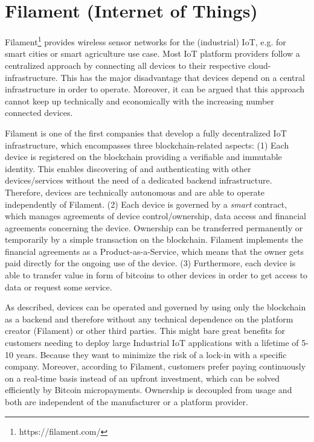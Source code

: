 \section{Filament (Internet of Things)}
\label{sec:ecofilament}

Filament\footnote{https://filament.com/} provides wireless sensor networks for the (industrial) IoT, e.g. 
for smart cities or smart agriculture use case. Most IoT platform providers follow 
a centralized approach by connecting all devices to their respective cloud-infrastructure. 
This has the major disadvantage that devices depend on a central infrastructure 
in order to operate. Moreover, it can be argued that this approach cannot keep 
up technically and economically with the increasing number connected devices.

Filament is one of the first companies that develop a fully decentralized IoT infrastructure, 
which encompasses three blockchain-related aspects: (1) Each device is registered 
on the blockchain providing a verifiable and immutable identity. This enables discovering 
of and authenticating with other devices/services without the need of a dedicated 
backend infrastructure. Therefore, devices are technically autonomous and are able 
to operate independently of Filament. (2) Each device is governed by a \emph{smart} 
contract, which manages agreements of device control/ownership, data access and 
financial agreements concerning the device. Ownership can be transferred permanently 
or temporarily by a simple transaction on the blockchain. Filament implements the 
financial agreements as a Product-as-a-Service, which means that the owner gets 
paid directly for the ongoing use of the device. (3) Furthermore, each device is 
able to transfer value in form of bitcoins to other devices in order to get access 
to data or request some service.

As described, devices can be operated and governed by using only the blockchain 
as a backend and therefore without any technical dependence on the platform creator 
(Filament) or other third parties. This might bare great benefits for customers 
needing to deploy large Industrial IoT applications with a lifetime of 5-10 years. 
Because they want to minimize the risk of a lock-in with a specific company. Moreover, 
according to Filament, customers prefer paying continuously on a real-time basis 
instead of an upfront investment, which can be solved efficiently by Bitcoin micropayments. 
Ownership is decoupled from usage and both are independent of the manufacturer 
or a platform provider.

